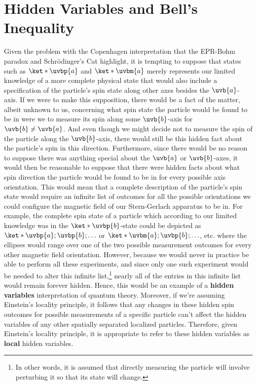 \documentclass[12pt]{report}
\begin{document}
\section{Hidden Variables and Bell's Inequality\label{hiddenbellsection}}
Given the problem with the Copenhagen interpretation that the EPR-Bohm paradox and Schr\"{o}dinger's Cat highlight, it is tempting to suppose that states such as $\ket*{\uvbp{a}}$ and $\ket*{\uvbm{a}}$ merely represents our limited knowledge of a more complete physical state that would also include a specification of the particle's spin state along other axes besides the $\uvb{a}$-axis. If we were to make this supposition, there would be a fact of the matter, albeit unknown to us, concerning what spin state the particle would be found to be in  were we to measure its spin along some $\uvb{b}$-axis for $\uvb{b}\neq\uvb{a}$. And  even though we might decide not to measure the spin of the particle along the $\uvb{b}$-axis, there would still be this hidden fact about the particle's spin in this direction. Furthermore, since there would be no reason to suppose there was anything special about the $\uvb{a}$ or $\uvb{b}$-axes, it would then be reasonable to suppose that there were hidden facts about what spin direction the particle would be found to be in for every possible axis orientation. This would mean that a complete description of the particle's spin state would require an infinite list of outcomes for all the possible orientations we could configure the magnetic field of our Stern-Gerlach apparatus to be in. For example, the complete spin state of a particle which according to our limited knowledge was in the $\ket*{\uvbp{b}}$-state could be depicted as $\ket*{\uvbp{a};\uvbp{b};\ldots}$ or  $\ket*{\uvbm{a};\uvbp{b};\ldots}$,  %
%
etc. where the ellipses would range over one of the two possible measurement outcomes for every other magnetic field orientation. However, because we would never in practice be able to perform all these experiments, and since only one such experiment would be needed to alter this infinite list,\footnote{In other words, it is assumed that directly measuring the particle will involve perturbing it so that its state will change.} nearly all of the entries in this infinite list would remain forever hidden. Hence, this would be an example of a \textbf{hidden variables} interpretation of quantum theory.  Moreover, if we're assuming Einstein's locality principle, it follows that any changes in these hidden spin outcomes for possible measurements of a specific particle can't affect the hidden variables of any other spatially separated localized particles. Therefore, given Einstein's locality principle, it is appropriate to refer to these hidden variables as \textbf{local} hidden variables.
\end{document}
